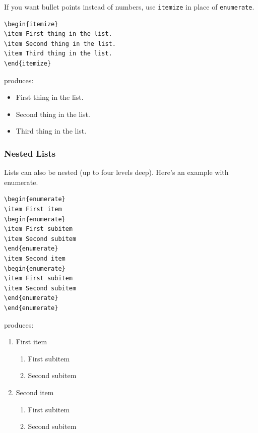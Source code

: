 \documentclass[12pt]{article}
\begin{document}
If you want bullet points instead of numbers, use \verb|itemize| in place of \verb|enumerate|.

\begin{verbatim}
\begin{itemize}
\item First thing in the list.
\item Second thing in the list.
\item Third thing in the list.
\end{itemize}
\end{verbatim}
produces:

\begin{itemize}
\item First thing in the list.
\item Second thing in the list.
\item Third thing in the list.
\end{itemize}

\subsubsection{Nested Lists}

Lists can also be nested (up to four levels deep). Here's an example with enumerate.

\begin{verbatim}
\begin{enumerate}
\item First item
\begin{enumerate}
\item First subitem
\item Second subitem
\end{enumerate}
\item Second item
\begin{enumerate}
\item First subitem
\item Second subitem
\end{enumerate}
\end{enumerate}
\end{verbatim}
produces:

\begin{enumerate}
\item First item
\begin{enumerate}
\item First subitem
\item Second subitem
\end{enumerate}
\item Second item
\begin{enumerate}
\item First subitem
\item Second subitem
\end{enumerate}
\end{enumerate}
\end{document}
